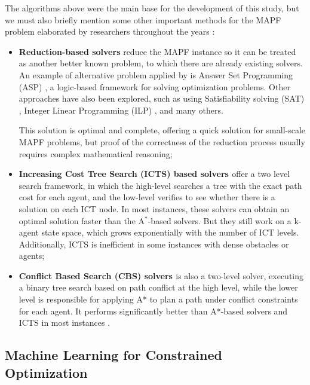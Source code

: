 The algorithms above were the main base for the development of this study, but we must also briefly mention some other important methods for the MAPF problem elaborated by researchers throughout the years \cite{gaoReviewGraphbasedMultiagent2024}:
\begin{itemize}
    \item \textbf{Reduction-based solvers} reduce the MAPF instance so it can be treated as another better known problem, to which there are already existing solvers. 
    An example of alternative problem applied by \cite{gomezSolvingSumofCostsMultiAgent2020} is Answer Set Programming (ASP) \cite{lifschitzWhatAnswerSet}, a logic-based framework for solving optimization problems. Other approaches have also been explored, such as using Satisfiability solving (SAT) \cite{surynekEfficientSATApproach2016}, Integer Linear Programming (ILP) \cite{yuOptimalMultirobotPath2016}, and many others.
    
    This solution is optimal and complete, offering a quick solution for small-scale MAPF problems, but proof of the correctness of the reduction process usually requires complex mathematical reasoning;
    \item \textbf{Increasing Cost Tree Search (ICTS) based solvers \cite{sharonIncreasingCostTree2013}} offer a two level search framework, in which the high-level searches a tree with the exact path cost for each agent, and the low-level verifies to see whether there is a solution on each ICT node. In most instances, these solvers can obtain an optimal solution faster than the A$^*$-based solvers. But they still work on a k-agent state space, which grows exponentially with the number of ICT levels. Additionally, ICTS is inefficient in some instances with dense obstacles or agents;
    \item \textbf{Conflict Based Search (CBS) solvers \cite{sharonConflictbasedSearchOptimal2015} \cite{liEECBSBoundedSuboptimalSearch2021}} is also a two-level solver, executing a binary tree search based on path conflict at the high level, while the lower level is responsible for applying A* to plan a path under conflict constraints for each agent. It performs significantly better than A*-based solvers and ICTS in most instances \cite{gaoReviewGraphbasedMultiagent2024}.
    
\end{itemize}

\subsection{Machine Learning for Constrained Optimization}

